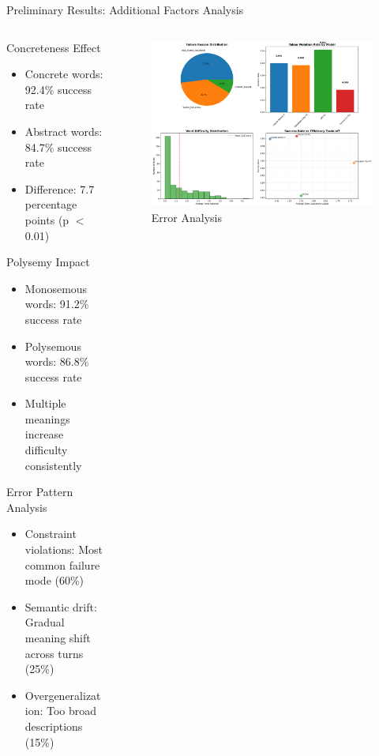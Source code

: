 \documentclass[aspectratio=169]{beamer}
\begin{document}
\begin{frame}{Preliminary Results: Additional Factors Analysis}
\begin{columns}[c]
\begin{column}{0.5\textwidth}
\begin{block}{Concreteness Effect}
\begin{itemize}
    \item Concrete words: 92.4\% success rate
    \item Abstract words: 84.7\% success rate
    \item Difference: 7.7 percentage points (p $<$ 0.01)
\end{itemize}
\end{block}

\begin{block}{Polysemy Impact}
\begin{itemize}
    \item Monosemous words: 91.2\% success rate
    \item Polysemous words: 86.8\% success rate
    \item Multiple meanings increase difficulty consistently
\end{itemize}
\end{block}

\begin{block}{Error Pattern Analysis}
\begin{itemize}
    \item Constraint violations: Most common failure mode (60\%)
    \item Semantic drift: Gradual meaning shift across turns (25\%)
    \item Overgeneralization: Too broad descriptions (15\%)
\end{itemize}
\end{block}
\end{column}

\begin{column}{0.48\textwidth}
\begin{figure}
\includegraphics[width=\textwidth]{comprehensive_figures/figure6_error_analysis.png}
\caption{Error Analysis}
\end{figure}
\end{column}
\end{columns}
\end{frame}
\end{document}
